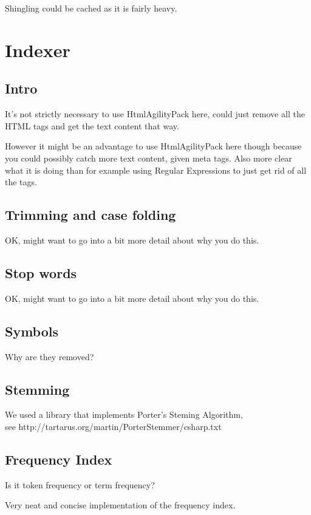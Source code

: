     Shingling could be cached as it is fairly heavy.
    
\section*{Indexer}
    \subsection{Intro}
    It's not strictly necessary to use HtmlAgilityPack here, could just remove all the HTML tags and get the text content that way. 
    
    However it might be an advantage to use HtmlAgilityPack here though because you could possibly catch more text content, given meta tags. Also more clear what it is doing than for example using Regular Expressions to just get rid of all the tags.
    
    \subsection{Trimming and case folding}
    OK, might want to go into a bit more detail about why you do this.
    
    \subsection{Stop words}
    OK, might want to go into a bit more detail about why you do this.
    
    \subsection{Symbols}
    Why are they removed?
    
    \subsection{Stemming}
    We used a library that implements Porter's Steming Algorithm, \\
    see http://tartarus.org/martin/PorterStemmer/csharp.txt
    
    \subsection{Frequency Index}
    Is it token frequency or term frequency?
    
    Very neat and concise implementation of the frequency index.
    

